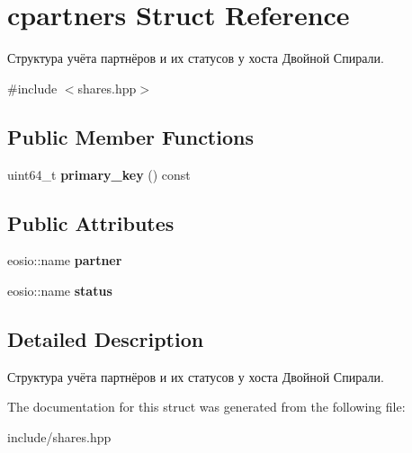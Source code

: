 \hypertarget{structcpartners}{}\section{cpartners Struct Reference}
\label{structcpartners}


Структура учёта партнёров и их статусов у хоста Двойной Спирали.  




{\ttfamily \#include $<$shares.\+hpp$>$}

\subsection*{Public Member Functions}
\begin{DoxyCompactItemize}
\item 
\mbox{\label{structcpartners_a7210a9809e0a37b8c1713db13069af8e}} 
uint64\+\_\+t {\bfseries primary\+\_\+key} () const
\end{DoxyCompactItemize}
\subsection*{Public Attributes}
\begin{DoxyCompactItemize}
\item 
\mbox{\label{structcpartners_a661c344097bedf36330b5e7c29c23b11}} 
eosio\+::name {\bfseries partner}
\item 
\mbox{\label{structcpartners_a670e44a1b2df809a957f1fd97319dc29}} 
eosio\+::name {\bfseries status}
\end{DoxyCompactItemize}


\subsection{Detailed Description}
Структура учёта партнёров и их статусов у хоста Двойной Спирали. 

The documentation for this struct was generated from the following file\+:\begin{DoxyCompactItemize}
\item 
include/shares.\+hpp\end{DoxyCompactItemize}
